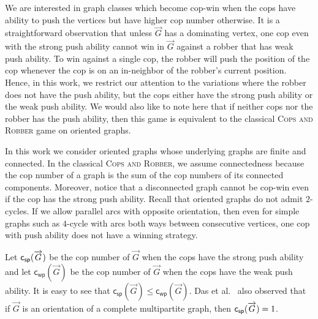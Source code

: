 \documentclass[a4paper,12pt]{amsart}
\newcommand{\csp}[1]{{\sf c_{sp}}(\overrightarrow{#1})}
\newcommand{\CR}{\textsc{Cops and Robber}\xspace}
\let\leq\leqslant
\begin{document}
We are interested in graph classes which become cop-win when the cops have ability to push the vertices but have higher cop number otherwise. It is a straightforward observation that unless $\overrightarrow{G}$ has a dominating vertex, one cop even with the strong push ability cannot win in $\overrightarrow{G}$ against a robber that has weak push ability. To win against a single cop, the robber will push the position of the cop whenever the cop is on an in-neighbor of the robber's current position. 
Hence, in this work, we restrict our attention to the variations where the robber does not have the push ability, but the cops either have the strong push ability or the weak push ability. We would also like to note here that if neither cops nor the robber has the push ability, then this game is equivalent to the classical \CR game on oriented graphs.

In this work we consider oriented graphs whose underlying graphs are  finite and connected. In the classical \CR, we assume connectedness because the cop number of a graph is the sum of the cop numbers of its connected components. Moreover, notice that a disconnected graph cannot be cop-win even if the cop has the strong push ability. Recall that oriented graphs do not admit $2$-cycles. If we allow parallel arcs with opposite orientation, then even for simple graphs such as $4$-cycle with arcs both ways between consecutive vertices, one cop with push ability does not have a winning strategy.

Let $\csp{G}$ be the cop number of $\overrightarrow{G}$ when the cops have the strong push ability and let $\mathsf{c_{wp}}(\overrightarrow{G})$ be the cop number of $\overrightarrow{G}$ when the cops have the weak push ability. It is easy to see that $\mathsf{c_{sp}}(\overrightarrow{G}) \leq \mathsf{c_{wp}}(\overrightarrow{G})$. Das et al.~\cite{das2023cops} also observed that if $\overrightarrow{G}$ is an orientation of a complete multipartite graph,  then $\csp{G} = 1$. 
\end{document}
